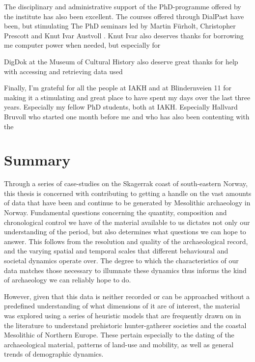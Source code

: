 The disciplinary and administrative support of the PhD-programme offered by the institute has also been excellent. The courses offered through DialPast have been, but  stimulating  The PhD seminars led by Martin Fürholt, Christopher Prescott and Knut Ivar Austvoll . Knut Ivar also deserves thanks for borrowing me computer power when needed, but especially for 

DigDok at the Museum of Cultural History also deserve great thanks for help with accessing and retrieving data used

Finally, I'm grateful for all the people at IAKH and at Blindernveien 11 for making it a stimulating and great place to have spent my days over the last three years. Especially my fellow PhD students, both at IAKH. Especially Hallvard Bruvoll who started one month before me and who has also been contenting with the 


\section*{Summary}
Through a series of case-studies on the Skagerrak coast of south-eastern Norway, this thesis is concerned with contributing to getting a handle on the vast amounts of data that have been and continue to be generated by Mesolithic archaeology in Norway. Fundamental questions concerning the quantity, composition and chronological control we have of the material available to us dictates not only our understanding of the period, but also determines what questions we can hope to answer. This follows from the resolution and quality of the archaeological record, and the varying spatial and temporal scales that different behavioural and societal dynamics operate over. The degree to which the characteristics of our data matches those necessary to illumnate these dynamics thus informs the kind of archaeology we can reliably hope to do.   

However, given that this data is neither recorded or can be approached without a predefined understanding of what dimensions of it are of interest, the material was explored using a series of heuristic models that are frequently drawn on in the literature to understand prehistoric hunter-gatherer societies and the coastal Mesolithic of Northern Europe. These pertain especially to the dating of the archaeological material, patterns of land-use and mobility, as well as general trends of demographic dynamics. 

